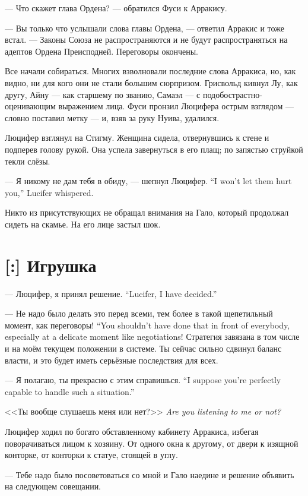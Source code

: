 --- Что скажет глава Ордена? --- обратился Фуси к Арракису.

--- Вы только что услышали слова главы Ордена, --- ответил Арракис и тоже встал.
--- Законы Союза не распространяются и не будут распространяться на адептов Ордена Преисподней.
Переговоры окончены.

Все начали собираться.
Многих взволновали последние слова Арракиса, но, как видно, ни для кого они не стали большим сюрпризом.
Грисвольд кивнул Лу, как другу, Айну --- как старшему по званию, Самаэл --- с подобострастно-оценивающим выражением лица.
Фуси пронзил Люцифера острым взглядом --- словно поставил метку --- и, взяв за руку Нуива, удалился.

Люцифер взглянул на Стигму.
Женщина сидела, отвернувшись к стене и подперев голову рукой.
Она успела завернуться в его плащ;
по запястью струйкой текли слёзы.

{--- Я никому не дам тебя в обиду, --- шепнул Люцифер.}
{``I won't let them hurt you,'' Lucifer whispered.}

Никто из присутствующих не обращал внимания на Гало, который продолжал сидеть на скамье.
На его лице застыл шок.

\section{[:] Игрушка}

{--- Люцифер, я принял решение.}
{``Lucifer, I have decided.''}

{--- Не надо было делать это перед всеми, тем более в такой щепетильный момент, как переговоры!}
{``You shouldn't have done that in front of everybody, especially at a delicate moment like negotiations!}
Стратегия завязана в том числе и на моём текущем положении в системе.
Ты сейчас сильно сдвинул баланс власти, и это будет иметь серьёзные последствия для всех.

{--- Я полагаю, ты прекрасно с этим справишься.}
{``I suppose you're perfectly capable to handle such a situation.''}

{<<Ты вообще слушаешь меня или нет?>>}
{\textit{Are you listening to me or not?}}

Люцифер ходил по богато обставленному кабинету Арракиса, избегая поворачиваться лицом к хозяину.
От одного окна к другому, от двери к изящной конторке, от конторки к статуе, стоящей в углу.

--- Тебе надо было посоветоваться со мной и Гало наедине и решение объявить на следующем совещании.

